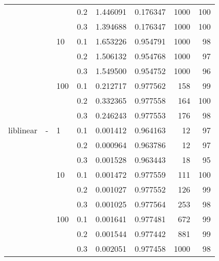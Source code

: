 \begin{table}[H]
\begin{tabular}{llllrrrr}
          &   &     & 0.2 &  1.446091 &  0.176347 &    1000 &   100 \\
          &   &     & 0.3 &  1.394688 &  0.176347 &    1000 &   100 \\
          &   & 10  & 0.1 &  1.653226 &  0.954791 &    1000 &    98 \\
          &   &     & 0.2 &  1.506132 &  0.954768 &    1000 &    97 \\
          &   &     & 0.3 &  1.549500 &  0.954752 &    1000 &    96 \\
          &   & 100 & 0.1 &  0.212717 &  0.977562 &     158 &    99 \\
          &   &     & 0.2 &  0.332365 &  0.977558 &     164 &   100 \\
          &   &     & 0.3 &  0.246243 &  0.977553 &     176 &    98 \\
liblinear & - & 1   & 0.1 &  0.001412 &  0.964163 &      12 &    97 \\
          &   &     & 0.2 &  0.000964 &  0.963786 &      12 &    97 \\
          &   &     & 0.3 &  0.001528 &  0.963443 &      18 &    95 \\
          &   & 10  & 0.1 &  0.001472 &  0.977559 &     111 &   100 \\
          &   &     & 0.2 &  0.001027 &  0.977552 &     126 &    99 \\
          &   &     & 0.3 &  0.001025 &  0.977564 &     253 &    98 \\
          &   & 100 & 0.1 &  0.001641 &  0.977481 &     672 &    99 \\
          &   &     & 0.2 &  0.001544 &  0.977442 &     881 &    99 \\
          &   &     & 0.3 &  0.002051 &  0.977458 &    1000 &    98 \\
\bottomrule
\end{tabular}
\end{table}
